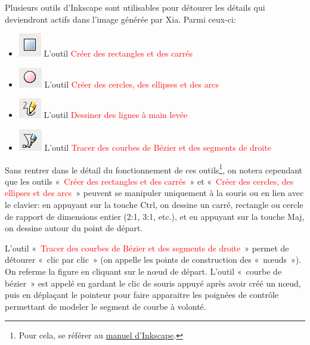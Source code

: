 \documentclass[a4paper,12pt]{report}
\newcommand{\chemin}[1]{\textcolor{red}{#1}}
\begin{document}
Plusieurs outils d'Inkscape sont utilisables pour détourer les détails qui deviendront actifs dans l'image générée 
par Xia. Parmi ceux-ci:
\begin{itemize}
 \item \includegraphics[scale=0.5]{./images/rec_carre} L'outil \chemin{Créer des rectangles et des carrés}
 \item \includegraphics[scale=0.5]{./images/cercles} L'outil \chemin{Créer des cercles, des ellipses et des arcs}
 \item \includegraphics[scale=0.5]{./images/lignes} L'outil \chemin{Dessiner des lignes à main levée}
 \item \includegraphics[scale=0.5]{./images/bezier} L'outil \chemin{Tracer des courbes de Bézier et des segments de droite}
\end{itemize}

Sans rentrer dans le détail du fonctionnement de ces outils\footnote{Pour cela, 
se référer au \href{http://inkscape.org/doc/shapes/tutorial-shapes.fr.html}{manuel d'Inkscape}.}, on notera cependant que
les outils «~\chemin{Créer des rectangles et des carrés}~» et «~\chemin{Créer des cercles, des ellipses et des arcs}~»
 peuvent se manipuler uniquement à la souris ou en lien avec le clavier: en appuyant sur la touche Ctrl, on 
 dessine un carré, rectangle ou cercle de rapport de dimensions entier (2:1, 3:1, etc.),
 et en appuyant sur la touche Maj, on dessine autour du point de départ.

L'outil «~\chemin{Tracer des courbes de Bézier et des segments de droite}~» permet de détourer «~clic par clic~»
(on appelle les points de construction des «~nœuds~»).
On referme la figure en cliquant sur le nœud de départ.
L'outil «~courbe de bézier~» est appelé en gardant le clic de souris appuyé après avoir créé un nœud, 
puis en déplaçant le pointeur pour faire apparaitre les poignées de contrôle permettant de modeler
le segment de courbe à volonté.
\end{document}
